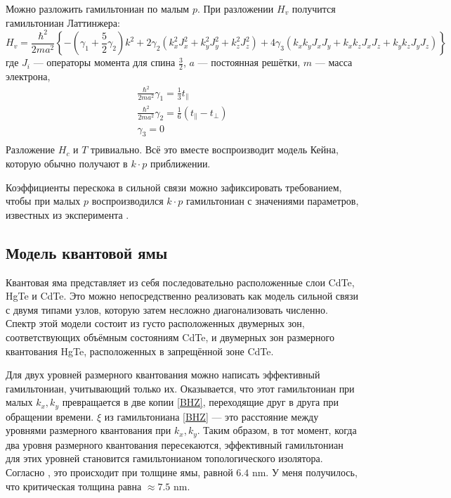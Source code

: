 Можно разложить гамильтониан по малым $p$.
При разложении $H_v$ получится
гамильтониан Латтинжера:
\begin{equation}
    H_v = \frac{\hbar^2}{2ma^2}\left\{-\left(\gamma_1 + \frac{5}{2}\gamma_2\right) k^2 + 
        2\gamma_2(k_x^2J_x^2 + k_y^2J_y^2 + k_z^2J_z^2) + 
        4\gamma_3(k_x k_y J_x J_y + k_x k_z J_x J_z + k_y k_z J_y J_z) \right\}
\end{equation}
где $J_i$ --- операторы момента для спина $\frac{3}{2}$, $a$ --- постоянная решётки,
$m$ --- масса электрона,
\begin{equation}
    \begin{gathered}
        \frac{\hbar^2}{2ma^2}\gamma_1 = \frac13 t_\parallel\\
        \frac{\hbar^2}{2ma^2}\gamma_2 = \frac16(t_\parallel - t_\perp)\\
        \gamma_3 = 0\\
    \end{gathered}
\end{equation}
Разложение $H_c$ и $T$ тривиально.
Всё это вместе воспроизводит модель Кейна, которую обычно получают в $k \cdot p$ приближении.

Коэффициенты перескока в сильной связи можно зафиксировать требованием, чтобы при малых $p$ 
воспроизводился $k\cdot p$ гамильтониан с значениями параметров, известных из эксперимента
\cite{Novik2005}. 

\subsection{Модель квантовой ямы}
Квантовая яма представляет из себя последовательно расположенные слои CdTe, HgTe и CdTe.
Это можно непосредственно реализовать как модель сильной связи с двумя типами узлов, которую
затем несложно диагонализовать численно. Спектр этой модели состоит из густо расположенных
двумерных зон, соответствующих объёмным состояниям CdTe, и двумерных зон размерного квантования
HgTe, расположенных в запрещённой зоне CdTe.

Для двух уровней размерного квантования можно написать эффективный гамильтониан,
учитывающий только их. Оказывается, что этот гамильтониан при малых $k_x,k_y$ превращается
в две копии 
\eqref{BHZ}, переходящие друг в друга при обращении времени. $\xi$ из гамильтониана \eqref{BHZ} --- это расстояние между уровнями размерного
квантования при $k_x, k_y$. Таким образом, в тот момент, когда два уровня размерного 
квантования пересекаются, эффективный гамильтониан для этих уровней становится 
гамильтонианом топологического изолятора. Согласно \cite{Bernevig2006}, это происходит
при толщине ямы, равной $6.4$ nm. У меня получилось, что критическая толщина равна
$\approx 7.5$ nm.

